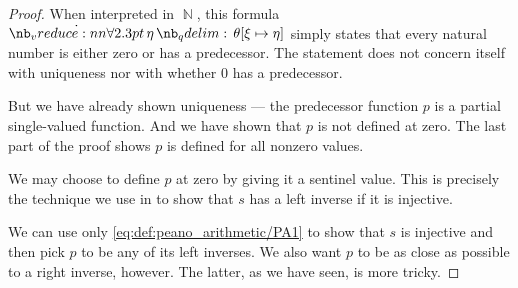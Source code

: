 \begin{proof}
  When interpreted in \( \BbbN \), this formula \( \qforall \eta \theta[\xi \mapsto \eta] \) simply states that every natural number is either zero or has a predecessor. The statement does not concern itself with uniqueness nor with whether \( 0 \) has a predecessor.

  But we have already shown uniqueness --- the predecessor function \( p \) is a partial single-valued function. And we have shown that \( p \) is not defined at zero. The last part of the proof shows \( p \) is defined for all nonzero values.

  We may choose to define \( p \) at zero by giving it a sentinel value. This is precisely the technique we use in  to show that \( s \) has a left inverse if it is injective.

  We can use only \eqref{eq:def:peano_arithmetic/PA1} to show that \( s \) is injective and then pick \( p \) to be any of its left inverses. We also want \( p \) to be as close as possible to a right inverse, however. The latter, as we have seen, is more tricky.
\end{proof}

